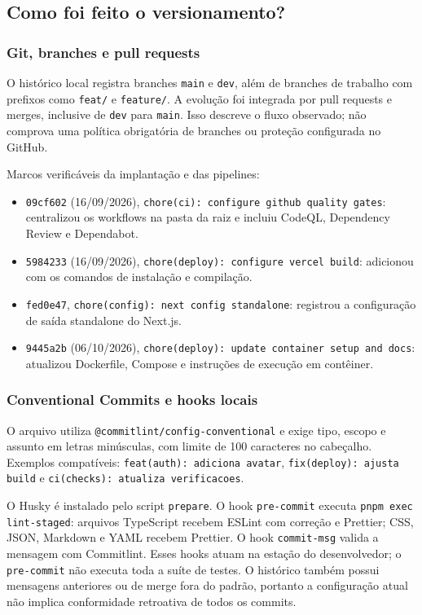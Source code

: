 \documentclass[12pt,a4paper]{article}
\begin{document}
\subsection{Como foi feito o versionamento?}
\subsubsection{Git, branches e pull requests}
O histórico local registra branches \texttt{main} e \texttt{dev}, além de branches de trabalho com prefixos como \texttt{feat/} e \texttt{feature/}. A evolução foi integrada por pull requests e merges, inclusive de \texttt{dev} para \texttt{main}. Isso descreve o fluxo observado; não comprova uma política obrigatória de branches ou proteção configurada no GitHub.

Marcos verificáveis da implantação e das pipelines:
\begin{itemize}
  \item \texttt{09cf602} (16/09/2026), \texttt{chore(ci): configure github quality gates}: centralizou os workflows na pasta  da raiz e incluiu CodeQL, Dependency Review e Dependabot.
  \item \texttt{5984233} (16/09/2026), \texttt{chore(deploy): configure vercel build}: adicionou  com os comandos de instalação e compilação.
  \item \texttt{fed0e47}, \texttt{chore(config): next config standalone}: registrou a configuração de saída standalone do Next.js.
  \item \texttt{9445a2b} (06/10/2026), \texttt{chore(deploy): update container setup and docs}: atualizou Dockerfile, Compose e instruções de execução em contêiner.
\end{itemize}

\subsubsection{Conventional Commits e hooks locais}
O arquivo  utiliza \texttt{@commitlint/config-conventional} e exige tipo, escopo e assunto em letras minúsculas, com limite de 100 caracteres no cabeçalho. Exemplos compatíveis: \texttt{feat(auth): adiciona avatar}, \texttt{fix(deploy): ajusta build} e \texttt{ci(checks): atualiza verificacoes}.

O Husky é instalado pelo script \texttt{prepare}. O hook \texttt{pre-commit} executa \texttt{pnpm exec lint-staged}: arquivos TypeScript recebem ESLint com correção e Prettier; CSS, JSON, Markdown e YAML recebem Prettier. O hook \texttt{commit-msg} valida a mensagem com Commitlint. Esses hooks atuam na estação do desenvolvedor; o \texttt{pre-commit} não executa toda a suíte de testes. O histórico também possui mensagens anteriores ou de merge fora do padrão, portanto a configuração atual não implica conformidade retroativa de todos os commits.
\end{document}
